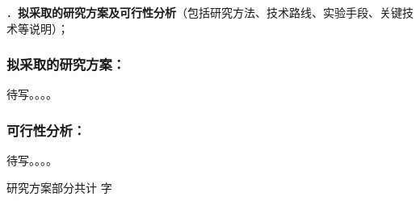 {\sihao \color{MsBlue} ．{\bfseries 拟采取的研究方案及可行性分析}（包括研究方法、技术路线、实验手段、关键技术等说明）；}

\subsubsection{{\bfseries 拟采取的研究方案：}}

待写。。。。


\subsubsection{{\bfseries 可行性分析：}}

待写。。。。


\ifhandout
\else
\begin{center}
{\larger[2]\color{red}  研究方案部分共计 \wordcount 字 }
\end{center}
\fi


\vskip 5mm

